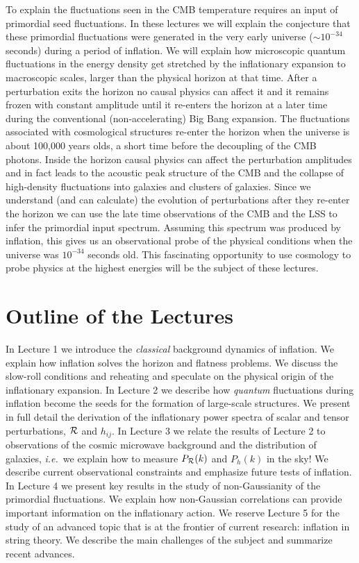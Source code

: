 \documentclass[12pt,letterpaper,rotate]{article}
\def\R{{\cal R}}
\begin{document}
{To explain the fluctuations seen in the CMB temperature requires an input of primordial seed fluctuations.
In these lectures we will explain the conjecture that these primordial fluctuations were generated in the very early universe ($\sim 10^{-34}$ seconds) during a period of inflation.
We will explain how microscopic quantum fluctuations in the energy density get stretched by the inflationary expansion to macroscopic scales, larger than the physical horizon at that time.
After a perturbation exits the horizon no causal physics can affect it and it remains frozen with constant amplitude until it re-enters the horizon at a later time during the conventional (non-accelerating) Big Bang expansion.  The fluctuations associated with cosmological structures re-enter the horizon when the universe is about 100,000 years olds, a short time before the decoupling of the CMB photons.
Inside the horizon causal physics can affect the perturbation amplitudes and in fact leads to the acoustic peak structure of the CMB and the collapse of high-density fluctuations into galaxies and clusters of galaxies.
Since we understand (and can calculate) the evolution of perturbations after they re-enter the horizon we can use the late time observations of the CMB and the LSS to infer the primordial input spectrum.
Assuming this spectrum was produced by inflation, this gives us an observational probe of the physical conditions when the universe was $10^{-34}$ seconds old.
This fascinating opportunity to use cosmology to probe physics at the highest energies will be the subject of these lectures.

\section{Outline of the Lectures}

In {Lecture 1} we introduce the {\it classical} background dynamics of inflation. We explain how inflation solves the horizon and flatness problems.  We discuss the slow-roll conditions and reheating and speculate on the physical origin of the inflationary expansion.
In {Lecture 2} we describe how {\it quantum} fluctuations during inflation become the seeds for the formation of large-scale structures. We present in full detail the derivation of the inflationary power spectra of scalar and tensor perturbations, $\R$ and $h_{ij}$.
In {Lecture 3} we relate the results of Lecture 2 to observations of the cosmic microwave background and the distribution of galaxies, {\it i.e.}~we explain how to measure $P_\R(k)$ and $P_h(k)$ in the sky! We describe current observational constraints and emphasize future tests of inflation.
In {Lecture 4} we present key results in the study of non-Gaussianity of the primordial fluctuations.
We explain how non-Gaussian correlations can provide important information on the inflationary action.
We reserve {Lecture 5} for the study of an advanced topic that is at the frontier of current research: 
inflation in string theory. We describe the main challenges of the subject and summarize recent advances.

}
\end{document}
